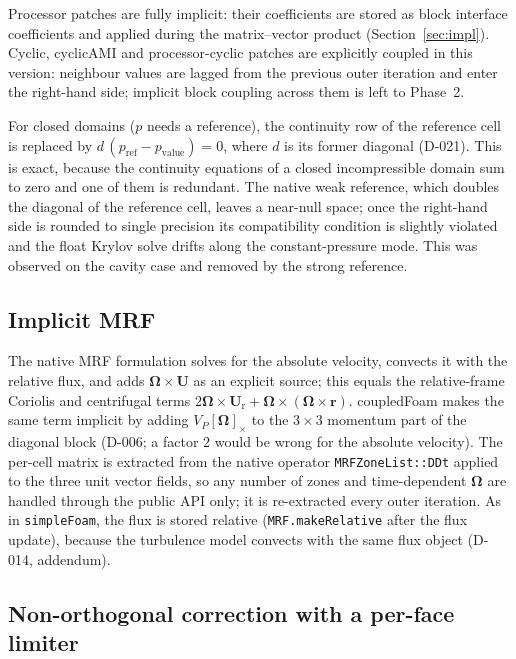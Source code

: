 \documentclass[11pt,a4paper]{article}
\newcommand{\vect}[1]{\mathbf{#1}}
\newcommand{\Uv}{\vect{U}}
\newcommand{\code}[1]{\texttt{#1}}
\begin{document}
Processor patches are fully implicit: their coefficients are stored as block
interface coefficients and applied during the matrix--vector product
(Section~\ref{sec:impl}). Cyclic, cyclicAMI and processor-cyclic patches
are explicitly coupled in this version: neighbour values are lagged from the
previous outer iteration and enter the right-hand side; implicit block
coupling across them is left to Phase~2.

For closed domains ($p$ needs a reference), the continuity row of the
reference cell is replaced by $d\,(p_{\mathrm{ref}}-p_{\mathrm{value}})=0$,
where $d$ is its former diagonal (D-021). This is exact, because the
continuity equations of a closed incompressible domain sum to zero and one of
them is redundant. The native weak reference, which doubles the diagonal of
the reference cell, leaves a near-null space; once the right-hand side is
rounded to single precision its compatibility condition is slightly violated
and the float Krylov solve drifts along the constant-pressure mode. This was
observed on the cavity case and removed by the strong reference.

\subsection{Implicit MRF}\label{sec:mrf}

The native MRF formulation solves for the absolute velocity, convects it with
the relative flux, and adds $\vect\Omega\times\Uv$ as an explicit source; this
equals the relative-frame Coriolis and centrifugal terms
$2\vect\Omega\times\Uv_{\mathrm{r}}+\vect\Omega\times(\vect\Omega\times\vect r)$.
coupledFoam makes the same term implicit by adding
$V_P[\vect\Omega]_\times$ to the $3\times3$ momentum part of the diagonal block
(D-006; a factor $2$ would be wrong for the absolute velocity). The per-cell
matrix is extracted from the native operator \code{MRFZoneList::DDt} applied to
the three unit vector fields, so any number of zones and time-dependent
$\vect\Omega$ are handled through the public API only; it is re-extracted every
outer iteration. As in \code{simpleFoam}, the flux is stored relative
(\code{MRF.makeRelative} after the flux update), because the turbulence model
convects with the same flux object (D-014, addendum).

\subsection{Non-orthogonal correction with a per-face limiter}\label{sec:nonorth}
\end{document}
